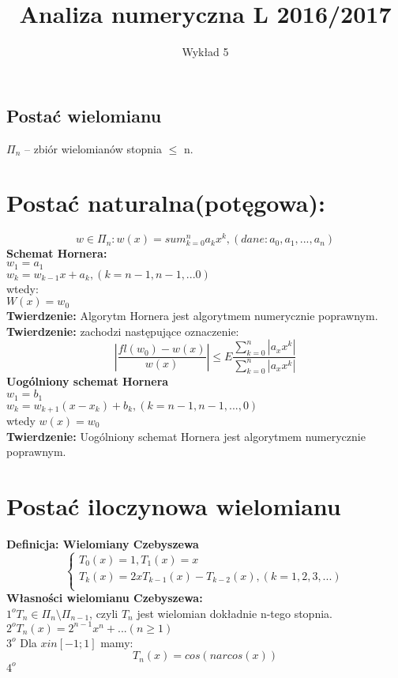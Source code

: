 \documentclass[12pt]{article}
\author{\LARGE Wykład 5}
\title{\bfseries\Huge Analiza numeryczna L 2016/2017}
\date{}
\begin{document}
\maketitle
\begin{center}
\section*{\Large Postać wielomianu }
\end{center}
$\Pi_n$ -- zbiór wielomianów stopnia $\leq$ n.\\
\section*{Postać naturalna(potęgowa):}
$$ w \in \Pi_n: w(x) = sum^n_{k=0} a_kx^k, (dane: a_0,a_1,..., a_n)$$
\textbf{Schemat Hornera:}\\
\linebreak
$w_1 = a_1$\\
$w_k = w_{k-1}x +a_k, (k = n-1,n-1,...0)$\\
wtedy:\\
$W(x) = w_0$\\
\linebreak
\textbf{Twierdzenie:} Algorytm Hornera jest algorytmem numerycznie poprawnym.\\
\linebreak
\textbf{Twierdzenie:} zachodzi następujące oznaczenie:
$$|\frac{fl(w_0)-w(x)}{w(x)}| \leq E \frac{\sum^n_{k=0}|a_x x^k|}{\sum^n_{k=0}|a_x x^k|}$$
\textbf{Uogólniony schemat Hornera}\\
\linebreak
$w_1 = b_1$\\
$w_k = w_{k+1}(x-x_k) + b_k, (k = n-1,n-1,...,0)$\\
wtedy $w(x) = w_0$\\
\linebreak
\textbf{Twierdzenie:} Uogólniony schemat Hornera jest algorytmem numerycznie poprawnym.
\section*{Postać iloczynowa wielomianu}
\textbf{Definicja: Wielomiany Czebyszewa}
$$
\left\{ \begin{array}{l}
T_0(x) = 1, T_1(x) = x\\
T_k(x) =2xT_{k-1}(x)-T_{k-2}(x), (k=1,2,3,...)\\
\end{array} \right.
$$
\textbf{Własności wielomianu Czebyszewa:}\\
$1^{o} T_n \in \Pi_n \setminus \Pi_{n-1}$, czyli $T_n$ jest wielomian dokładnie n-tego stopnia.\\
$2^{o} T_n(x) = 2^{n-1}x^n+...(n \geq 1)$\\
$3^{o}$ Dla $x in [-1;1]$ mamy:
$$T_n(x) = cos(narcos(x))$$
$4^{o}$
\setcounter{page}{2}
\end{document}
